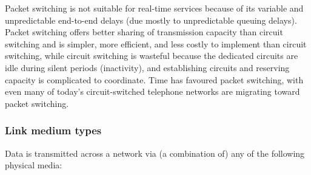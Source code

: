 \documentclass[8pt, table, xcdraw]{article}%
\begin{document}
Packet switching is not suitable for real-time services because of its variable and unpredictable end-to-end delays (due mostly to unpredictable queuing delays). Packet switching offers better sharing of transmission capacity than circuit switching and is simpler, more efficient, and less costly to implement than circuit switching, while circuit switching is wasteful because the dedicated circuits are idle during silent periods (inactivity), and establishing circuits and reserving capacity is complicated to coordinate. Time has favoured packet switching, with even many of today’s circuit-switched telephone networks are migrating toward packet switching.

\subsubsection{Link medium types}

Data is transmitted across a network via (a combination of) any of the following physical media:
\end{document}
